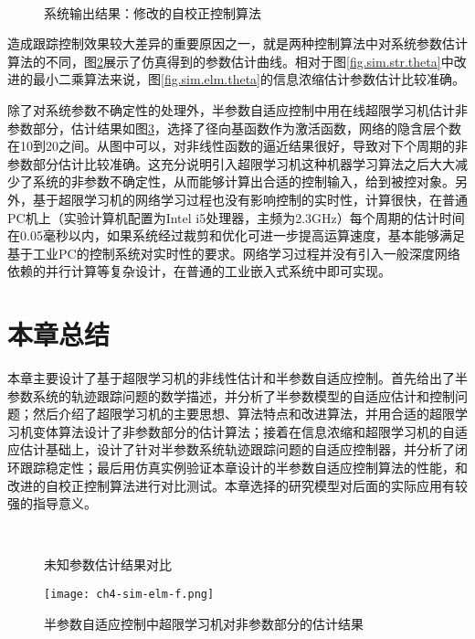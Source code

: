 \begin{figure}[!htb]
	\centering
	\\
	\caption{系统输出结果：修改的自校正控制算法}
	\label{fig.sim.str.sys}
\end{figure}

造成跟踪控制效果较大差异的重要原因之一，就是两种控制算法中对系统参数估计算法的不同，图\ref{fig.sim.str.sys}展示了仿真得到的参数估计曲线。相对于图\ref{fig.sim.str.theta}中改进的最小二乘算法来说，图\ref{fig.sim.elm.theta}的信息浓缩估计参数估计比较准确。

除了对系统参数不确定性的处理外，半参数自适应控制中用在线超限学习机估计非参数部分，估计结果如图\ref{fig:4.sim.elm.f}，选择了径向基函数作为激活函数，网络的隐含层个数在10到20之间。从图中可以，对非线性函数的逼近结果很好，导致对下个周期的非参数部分估计比较准确。这充分说明引入超限学习机这种机器学习算法之后大大减少了系统的非参数不确定性，从而能够计算出合适的控制输入，给到被控对象。另外，基于超限学习机的网络学习过程也没有影响控制的实时性，计算很快，在普通PC机上（实验计算机配置为Intel i5处理器，主频为2.3GHz）每个周期的估计时间在0.05毫秒以内，如果系统经过裁剪和优化可进一步提高运算速度，基本能够满足基于工业PC的控制系统对实时性的要求。网络学习过程并没有引入一般深度网络依赖的并行计算等复杂设计，在普通的工业嵌入式系统中即可实现。

\section{本章总结}\label{sect:4.5}
本章主要设计了基于超限学习机的非线性估计和半参数自适应控制。首先给出了半参数系统的轨迹跟踪问题的数学描述，并分析了半参数模型的自适应估计和控制问题；然后介绍了超限学习机的主要思想、算法特点和改进算法，并用合适的超限学习机变体算法设计了非参数部分的估计算法；接着在信息浓缩和超限学习机的自适应估计基础上，设计了针对半参数系统轨迹跟踪问题的自适应控制器，并分析了闭环跟踪稳定性；最后用仿真实例验证本章设计的半参数自适应控制算法的性能，和改进的自校正控制算法进行对比测试。本章选择的研究模型对后面的实际应用有较强的指导意义。

\begin{figure}[!htb]
	\centering
	\\
	\caption{未知参数估计结果对比}
	\label{fig.sim.str.sys}
\end{figure}

\begin{figure}[!htb]
  \centering
  \texttt{[image: ch4-sim-elm-f.png]}\\
  \caption{半参数自适应控制中超限学习机对非参数部分的估计结果}
  \label{fig:4.sim.elm.f}
\end{figure}